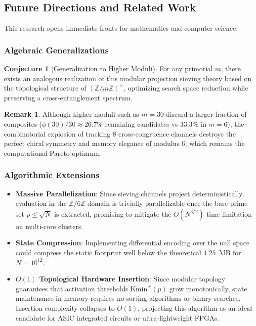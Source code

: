 \documentclass{article}
\numberwithin{equation}{section}
\theoremstyle{plain}
\theoremstyle{definition}
\newtheorem{remark}[theorem]{Remark}
\newtheorem{conjecture}[theorem]{Conjecture}
\begin{document}
\subsection{Future Directions and Related Work}

This research opens immediate fronts for mathematics and computer science:

\subsubsection{Algebraic Generalizations}

\begin{conjecture}[Generalization to Higher Moduli]
For any primorial $m$, there exists an analogous realization of this modular projection sieving theory based on the topological structure of $(\mathbb{Z}/m\mathbb{Z})^\times$, optimizing search space reduction while preserving a cross-entanglement spectrum.
\end{conjecture}

\begin{remark}
Although higher moduli such as $m=30$ discard a larger fraction of composites ($\phi(30)/30 \approx 26.7\%$ remaining candidates vs $33.3\%$ in $m=6$), the combinatorial explosion of tracking $8$ cross-congruence channels destroys the perfect chiral symmetry and memory elegance of modulus 6, which remains the computational Pareto optimum.
\end{remark}

\subsubsection{Algorithmic Extensions}

\begin{itemize}
    \item \textbf{Massive Parallelization}: Since sieving channels project deterministically, evaluation in the $\mathbb{Z}/6\mathbb{Z}$ domain is trivially parallelizable once the base prime set $p \le \sqrt{N}$ is extracted, promising to mitigate the $O(N^{3/2})$ time limitation on multi-core clusters.
    \item \textbf{State Compression}: Implementing differential encoding over the null space could compress the static footprint well below the theoretical $1.25$~MB for $N=10^{12}$.
    \item \textbf{$O(1)$ Topological Hardware Insertion}: Since modular topology guarantees that activation thresholds $\mathrm{Kmin}^+(p)$ grow monotonically, state maintenance in memory requires no sorting algorithms or binary searches. Insertion complexity collapses to $O(1)$, projecting this algorithm as an ideal candidate for ASIC integrated circuits or ultra-lightweight FPGAs.
\end{itemize}
\end{document}
